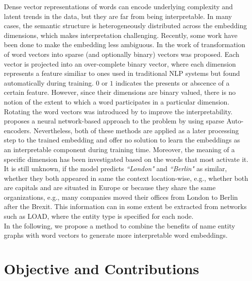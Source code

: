 Dense vector representations of words can encode underlying complexity and latent trends in the data, but they are far from being interpretable. In many cases, the semantic structure is heterogeneously distributed across the embedding dimensions, which makes interpretation challenging. 
Recently, some work have been done to make the embedding less ambiguous. In the work of  transformation of word vectors into sparse (and optionally binary) vectors was proposed. Each vector is projected into an over-complete binary vector, where each dimension represents a feature similiar to ones used in traditional NLP systems but found automatically during training. $0$ or $1$ indicates the presents or abscence of a certain feature. However, since their dimensions are binary valued, there is no notion of the extent to which a word participates in a particular dimension. Rotating the word vectors was introduced by  to improve the interpretability.   proposes a neural network-based approach to the problem by using sparse Auto-encoders. 
Nevertheless, both of these methods are applied as a later processing step to the trained embedding and offer no solution to learn the embeddings as an interpretable component during training time. Moreover, the meaning of a specific dimension has been investigated based on the words that most activate it. It is still unknown, if the model predicts \emph{``London"} and \emph{``Berlin"} as similar, whether they both appeared in same the context location-wise, e.g., whether both are capitals and are situated in Europe or because they share the same organizations, e.g., many companies moved their offices from London to Berlin after the Brexit. This information can in some extent be extracted from networks such as LOAD, where the entity type is specified for each node.\\
In the following, we propose a method to combine the benefits of name entity graphs with word vectors to generate more interpretable word embeddings.

\section{Objective and Contributions}

